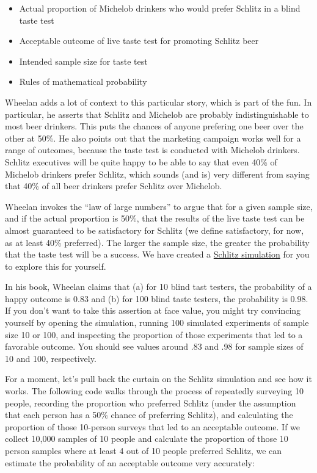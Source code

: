 \documentclass[openany]{book}
\providecommand{\tightlist}{%
  \setlength{\itemsep}{0pt}\setlength{\parskip}{0pt}}
\begin{document}
\begin{itemize}
\tightlist
\item
  Actual proportion of Michelob drinkers who would prefer Schlitz in a blind taste test
\item
  Acceptable outcome of live taste test for promoting Schlitz beer
\item
  Intended sample size for taste test
\item
  Rules of mathematical probability
\end{itemize}

Wheelan adds a lot of context to this particular story, which is part of the fun. In particular, he asserts that Schlitz and Michelob are probably indistinguishable to most beer drinkers. This puts the chances of anyone prefering one beer over the other at 50\%. He also points out that the marketing campaign works well for a range of outcomes, because the taste test is conducted with Michelob drinkers. Schlitz executives will be quite happy to be able to say that even 40\% of Michelob drinkers prefer Schlitz, which sounds (and is) very different from saying that 40\% of all beer drinkers prefer Schlitz over Michelob.

Wheelan invokes the ``law of large numbers'' to argue that for a given sample size, and if the actual proportion is 50\%, that the results of the live taste test can be almost guaranteed to be satisfactory for Schlitz (we define satisfactory, for now, as at least 40\% preferred). The larger the sample size, the greater the probability that the taste test will be a success. We have created a \href{https://ybergner.shinyapps.io/Schlitz/}{Schlitz simulation} for you to explore this for yourself.

In his book, Wheelan claims that (a) for 10 blind tast testers, the probability of a happy outcome is 0.83 and (b) for 100 blind taste testers, the probability is 0.98. If you don't want to take this assertion at face value, you might try convincing yourself by opening the simulation, running 100 simulated experiments of sample size 10 or 100, and inspecting the proportion of those experiments that led to a favorable outcome. You should see values around .83 and .98 for sample sizes of 10 and 100, respectively.

For a moment, let's pull back the curtain on the Schlitz simulation and see how it works. The following code walks through the process of repeatedly surveying 10 people, recording the proportion who preferred Schlitz (under the assumption that each person has a 50\% chance of preferring Schlitz), and calculating the proportion of those 10-person surveys that led to an acceptable outcome. If we collect 10,000 samples of 10 people and calculate the proportion of those 10 person samples where at least 4 out of 10 people preferred Schlitz, we can estimate the probability of an acceptable outcome very accurately:
\end{document}
